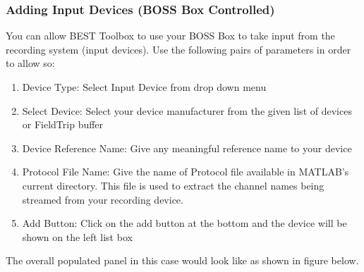 \documentclass[letterpaper,10pt,english]{sphinxmanual}
\begin{document}
\subsubsection{Adding Input Devices (BOSS Box Controlled)}
\label{\detokenize{5_HardwareConfiguration:adding-input-devices-boss-box-controlled}}
\sphinxAtStartPar
You can allow BEST Toolbox to use your BOSS Box to take input from the recording system (input devices). Use the following pairs of parameters in order to allow so:
\begin{enumerate}
%
\item {} 
\sphinxAtStartPar
Device Type: Select Input Device from drop down menu

\item {} 
\sphinxAtStartPar
Select Device: Select your device manufacturer from the given list of devices or FieldTrip buffer

\item {} 
\sphinxAtStartPar
Device Reference Name: Give any meaningful reference name to your device

\item {} 
\sphinxAtStartPar
Protocol File Name: Give the name of Protocol file available in MATLAB’s current directory. This file is used to extract the channel names being streamed from your recording device.

\item {} 
\sphinxAtStartPar
Add Button: Click on the add button at the bottom and the device will be shown on the left list box

\end{enumerate}

\sphinxAtStartPar
The overall populated panel in this case would look like as shown in figure below.
\end{document}

